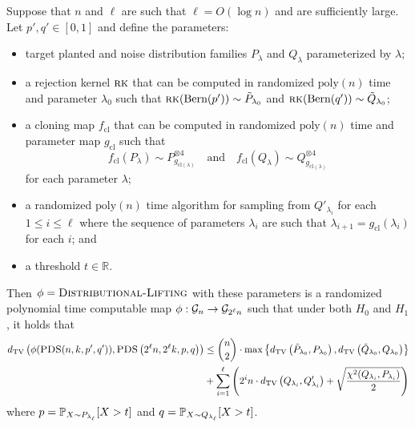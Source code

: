 \begin{theorem} \label{lem:5cc}
Suppose that $n$ and $\ell$ are such that $\ell = O(\log n)$ and are sufficiently large. Let $p', q' \in [0, 1]$ and define the parameters:
\begin{itemize}
\item target planted and noise distribution families $P_{\lambda}$ and $Q_{\lambda}$ parameterized by $\lambda$;
\item a rejection kernel $\textsc{rk}$ that can be computed in randomized $\text{poly}(n)$ time and parameter $\lambda_0$ such that $\textsc{rk}(\text{Bern}(p')) \sim \tilde{P}_{\lambda_0}$ and $\textsc{rk}(\text{Bern}(q')) \sim \tilde{Q}_{\lambda_0}$;
\item a cloning map $f_{\text{cl}}$ that can be computed in randomized $\text{poly}(n)$ time and parameter map $g_{\text{cl}}$ such that
$$f_{\text{cl}}(P_\lambda) \sim P_{g_{\text{cl}(\lambda)}}^{\otimes 4} \quad \text{and} \quad f_{\text{cl}}(Q_\lambda) \sim Q_{g_{\text{cl}(\lambda)}}^{\otimes 4}$$
for each parameter $\lambda$;
\item a randomized $\text{poly}(n)$ time algorithm for sampling from $Q'_{\lambda_i}$ for each $1 \le i \le \ell$ where the sequence of parameters $\lambda_i$ are such that $\lambda_{i+1} = g_{\text{cl}}(\lambda_i)$ for each $i$; and
\item a threshold $t \in \mathbb{R}$.
\end{itemize}
Then $ \phi = \textsc{Distributional-Lifting}$ with these parameters is a randomized polynomial time computable map $\phi : \mathcal{G}_n \to \mathcal{G}_{2^\ell n}$ such that under both $H_0$ and $H_1$, it holds that
\begin{align*}
d_{\text{TV}}\left( \phi(\textsc{PDS}(n, k, p', q')), \textsc{PDS}\left(2^\ell n, 2^\ell k, p, q \right) \right) &\le \binom{n}{2} \cdot \max\left\{ d_{\text{TV}}\left( \tilde{P}_{\lambda_0}, P_{\lambda_0} \right), d_{\text{TV}}\left( \tilde{Q}_{\lambda_0}, Q_{\lambda_0} \right) \right\} \\
& + \sum_{i = 1}^{\ell} \left( 2^i n \cdot d_{\text{TV}}\left(Q_{\lambda_i}, Q'_{\lambda_i}\right) + \sqrt{\frac{\chi^2(Q_{\lambda_i}, P_{\lambda_i})}{2}} \right)
\end{align*}
where $p = \mathbb{P}_{X \sim P_{\lambda_\ell}}[ X > t]$ and $q = \mathbb{P}_{X \sim Q_{\lambda_\ell}}[ X > t]$.
\end{theorem}

